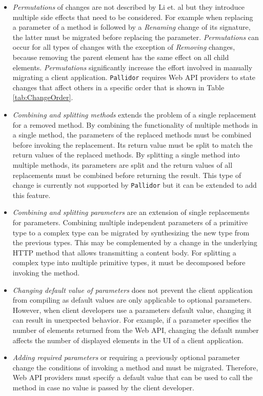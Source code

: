 \begin{description}
\begin{itemize}
		\item \textit{Permutations} of changes are not described by Li et. al \cite{li_how_2013} but they introduce multiple side effects that need to be considered. For example when replacing a parameter of a method is followed by a \textit{Renaming} change of its signature, the latter must be migrated before replacing the parameter. \textit{Permutations} can occur for all types of changes with the exception of \textit{Removing} changes, because removing the parent element has the same effect on all child elements. \textit{Permutations} significantly increase the effort involved in manually migrating a client application. \texttt{Pallidor} requires Web API providers to state changes that affect others in a specific order that is shown in Table \ref{tab:ChangeOrder}.
		\item \textit{Combining and splitting methods} extends the problem of a single replacement for a removed method. By combining the functionality of multiple methods in a single method, the parameters of the replaced methods must be combined before invoking the replacement. Its return value must be split to match the return values of the replaced methods. By splitting a single method into multiple methods, its parameters are split and the return values of all replacements must be combined before returning the result. This type of change is currently not supported by \texttt{Pallidor} but it can be extended to add this feature.
		\item \textit{Combining and splitting parameters} are an extension of single replacements for parameters. Combining multiple independent parameters of a primitive type to a complex type can be migrated by synthesizing the new type from the previous types. This may be complemented by a change in the underlying HTTP method that allows transmitting a content body. For splitting a complex type into multiple primitive types, it must be decomposed before invoking the method.
		\item \textit{Changing default value of parameters} does not prevent the client application from compiling as default values are only applicable to optional parameters. However, when client developers use a parameters default value, changing it can result in unexpected behavior. For example, if a parameter specifies the number of elements returned from the Web API, changing the default number affects the number of displayed elements in the UI of a client application.
		\item \textit{Adding required parameters} or requiring a previously optional parameter change the conditions of invoking a method and must be migrated. Therefore, Web API providers must specify a default value that can be used to call the method in case no value is passed by the client developer.

\end{itemize}
\end{description}
